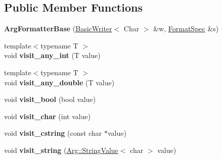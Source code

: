 \subsection*{Public Member Functions}
\begin{DoxyCompactItemize}
\item 
{\bfseries Arg\+Formatter\+Base} (\hyperlink{classfmt_1_1BasicWriter}{Basic\+Writer}$<$ Char $>$ \&w, \hyperlink{structfmt_1_1FormatSpec}{Format\+Spec} \&s)\hypertarget{classfmt_1_1internal_1_1ArgFormatterBase_a67f48acedb2ba3f243150c41f964252b}{}\label{classfmt_1_1internal_1_1ArgFormatterBase_a67f48acedb2ba3f243150c41f964252b}

\item 
{\footnotesize template$<$typename T $>$ }\\void {\bfseries visit\+\_\+any\+\_\+int} (T value)\hypertarget{classfmt_1_1internal_1_1ArgFormatterBase_ae6f9ce1fa7940ebda3ac594a45edd32d}{}\label{classfmt_1_1internal_1_1ArgFormatterBase_ae6f9ce1fa7940ebda3ac594a45edd32d}

\item 
{\footnotesize template$<$typename T $>$ }\\void {\bfseries visit\+\_\+any\+\_\+double} (T value)\hypertarget{classfmt_1_1internal_1_1ArgFormatterBase_a670214e1773c9c86002be07c043566dd}{}\label{classfmt_1_1internal_1_1ArgFormatterBase_a670214e1773c9c86002be07c043566dd}

\item 
void {\bfseries visit\+\_\+bool} (bool value)\hypertarget{classfmt_1_1internal_1_1ArgFormatterBase_a379b2f30d3e0526c88be65f8a2b596be}{}\label{classfmt_1_1internal_1_1ArgFormatterBase_a379b2f30d3e0526c88be65f8a2b596be}

\item 
void {\bfseries visit\+\_\+char} (int value)\hypertarget{classfmt_1_1internal_1_1ArgFormatterBase_ab85eb2158c9d48c847706de26f35460c}{}\label{classfmt_1_1internal_1_1ArgFormatterBase_ab85eb2158c9d48c847706de26f35460c}

\item 
void {\bfseries visit\+\_\+cstring} (const char $\ast$value)\hypertarget{classfmt_1_1internal_1_1ArgFormatterBase_a35e5c4d1580f7eec032661f9823c0cad}{}\label{classfmt_1_1internal_1_1ArgFormatterBase_a35e5c4d1580f7eec032661f9823c0cad}

\item 
void {\bfseries visit\+\_\+string} (\hyperlink{structfmt_1_1internal_1_1Value_1_1StringValue}{Arg\+::\+String\+Value}$<$ char $>$ value)\hypertarget{classfmt_1_1internal_1_1ArgFormatterBase_a937a7808ebf21736498e32abba6a0046}{}\label{classfmt_1_1internal_1_1ArgFormatterBase_a937a7808ebf21736498e32abba6a0046}


\end{DoxyCompactItemize}
